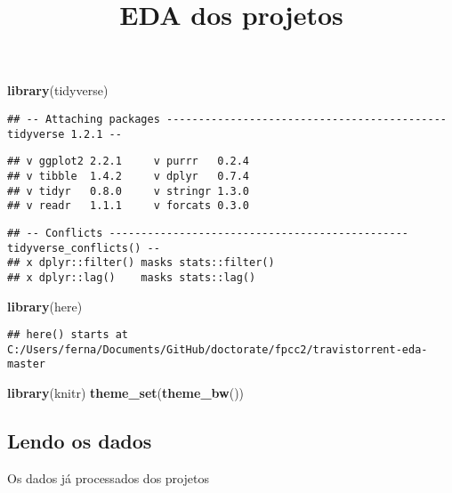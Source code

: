 \documentclass[]{article}
\title{EDA dos projetos}
\author{}
\date{}
\newenvironment{Shaded}{\begin{snugshade}}{\end{snugshade}}
\newcommand{\KeywordTok}[1]{\textcolor[rgb]{0.13,0.29,0.53}{\textbf{#1}}}
\newcommand{\NormalTok}[1]{#1}
\begin{document}
\maketitle

\begin{Shaded}
\begin{Highlighting}[]
\KeywordTok{library}\NormalTok{(tidyverse)}
\end{Highlighting}
\end{Shaded}

\begin{verbatim}
## -- Attaching packages -------------------------------------------- tidyverse 1.2.1 --
\end{verbatim}

\begin{verbatim}
## v ggplot2 2.2.1     v purrr   0.2.4
## v tibble  1.4.2     v dplyr   0.7.4
## v tidyr   0.8.0     v stringr 1.3.0
## v readr   1.1.1     v forcats 0.3.0
\end{verbatim}

\begin{verbatim}
## -- Conflicts ----------------------------------------------- tidyverse_conflicts() --
## x dplyr::filter() masks stats::filter()
## x dplyr::lag()    masks stats::lag()
\end{verbatim}

\begin{Shaded}
\begin{Highlighting}[]
\KeywordTok{library}\NormalTok{(here)}
\end{Highlighting}
\end{Shaded}

\begin{verbatim}
## here() starts at C:/Users/ferna/Documents/GitHub/doctorate/fpcc2/travistorrent-eda-master
\end{verbatim}

\begin{Shaded}
\begin{Highlighting}[]
\KeywordTok{library}\NormalTok{(knitr)}
\KeywordTok{theme_set}\NormalTok{(}\KeywordTok{theme_bw}\NormalTok{())}
\end{Highlighting}
\end{Shaded}

\subsection{Lendo os dados}\label{lendo-os-dados}

Os dados já processados dos projetos
\end{document}
